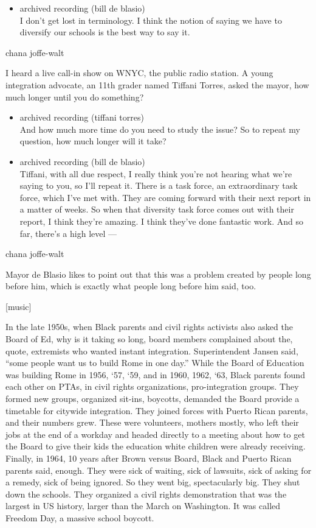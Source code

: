 \begin{itemize}
\tightlist
\item
  archived recording (bill de blasio)\\
  I don't get lost in terminology. I think the notion of saying we have
  to diversify our schools is the best way to say it.
\end{itemize}

chana joffe-walt

I heard a live call-in show on WNYC, the public radio station. A young
integration advocate, an 11th grader named Tiffani Torres, asked the
mayor, how much longer until you do something?

\begin{itemize}
\item
  archived recording (tiffani torres)\\
  And how much more time do you need to study the issue? So to repeat my
  question, how much longer will it take?
\item
  archived recording (bill de blasio)\\
  Tiffani, with all due respect, I really think you're not hearing what
  we're saying to you, so I'll repeat it. There is a task force, an
  extraordinary task force, which I've met with. They are coming forward
  with their next report in a matter of weeks. So when that diversity
  task force comes out with their report, I think they're amazing. I
  think they've done fantastic work. And so far, there's a high level
  ---
\end{itemize}

chana joffe-walt

Mayor de Blasio likes to point out that this was a problem created by
people long before him, which is exactly what people long before him
said, too.

{[}music{]}

In the late 1950s, when Black parents and civil rights activists also
asked the Board of Ed, why is it taking so long, board members
complained about the, quote, extremists who wanted instant integration.
Superintendent Jansen said, ``some people want us to build Rome in one
day.'' While the Board of Education was building Rome in 1956, `57, `59,
and in 1960, 1962, `63, Black parents found each other on PTAs, in civil
rights organizations, pro-integration groups. They formed new groups,
organized sit-ins, boycotts, demanded the Board provide a timetable for
citywide integration. They joined forces with Puerto Rican parents, and
their numbers grew. These were volunteers, mothers mostly, who left
their jobs at the end of a workday and headed directly to a meeting
about how to get the Board to give their kids the education white
children were already receiving. Finally, in 1964, 10 years after Brown
versus Board, Black and Puerto Rican parents said, enough. They were
sick of waiting, sick of lawsuits, sick of asking for a remedy, sick of
being ignored. So they went big, spectacularly big. They shut down the
schools. They organized a civil rights demonstration that was the
largest in US history, larger than the March on Washington. It was
called Freedom Day, a massive school boycott.

